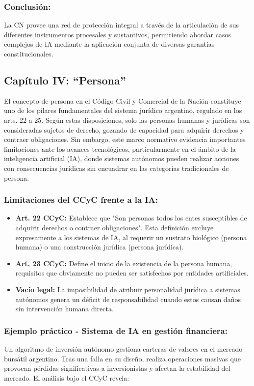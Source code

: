 \documentclass[10pt, a4paper]{article}
\begin{document}
\subsubsection*{Conclusión:}
La CN provee una red de protección integral a través de la articulación de sus diferentes instrumentos procesales y sustantivos, permitiendo abordar casos complejos de IA mediante la aplicación conjunta de diversas garantías constitucionales.
\subsection{Capítulo IV: ``Persona''}
\label{subsec:persona}

El concepto de persona en el Código Civil y Comercial de la Nación \parencite{ccyc} constituye uno de los pilares fundamentales del sistema jurídico argentino, regulado en los arts. 22 a 25. Según estas disposiciones, solo las personas humanas y jurídicas son consideradas sujetos de derecho, gozando de capacidad para adquirir derechos y contraer obligaciones. Sin embargo, este marco normativo evidencia importantes limitaciones ante los avances tecnológicos, particularmente en el ámbito de la inteligencia artificial (IA), donde sistemas autónomos pueden realizar acciones con consecuencias jurídicas sin encuadrar en las categorías tradicionales de persona.

\subsubsection*{Limitaciones del CCyC frente a la IA:}
\begin{itemize}
    \item \textbf{Art. 22 CCyC:} Establece que "Son personas todos los entes susceptibles de adquirir derechos o contraer obligaciones". Esta definición excluye expresamente a los sistemas de IA, al requerir un sustrato biológico (persona humana) o una construcción jurídica (persona jurídica).
    \item \textbf{Art. 23 CCyC:} Define el inicio de la existencia de la persona humana, requisitos que obviamente no pueden ser satisfechos por entidades artificiales.
    \item \textbf{Vacío legal:} La imposibilidad de atribuir personalidad jurídica a sistemas autónomos genera un déficit de responsabilidad cuando estos causan daños sin intervención humana directa.
\end{itemize}

\subsubsection*{Ejemplo práctico - Sistema de IA en gestión financiera:}
Un algoritmo de inversión autónomo gestiona carteras de valores en el mercado bursátil argentino. Tras una falla en su diseño, realiza operaciones masivas que provocan pérdidas significativas a inversionistas y afectan la estabilidad del mercado. El análisis bajo el CCyC revela:
\end{document}
